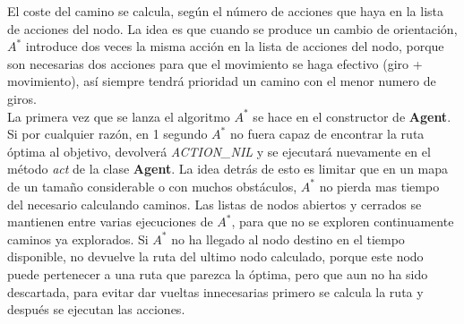 El coste del camino se calcula, según el número de acciones que haya en la lista de acciones del nodo. La idea es que  cuando se produce un cambio de orientación, $ A^{*} $ introduce dos veces la misma acción en la lista de acciones del nodo, porque son necesarias dos acciones para que el movimiento se haga efectivo (giro + movimiento), así siempre tendrá prioridad un camino con el menor numero de giros.\\
La primera vez que se lanza el algoritmo $ A^{*} $ se hace en el constructor de \textbf{Agent}. Si por cualquier razón, en 1 segundo $ A^{*} $ no fuera capaz de encontrar la ruta óptima al objetivo, devolverá \emph{ACTION\_NIL} y se ejecutará nuevamente en el método \emph{act} de la clase \textbf{Agent}. La idea detrás de esto es limitar que en un mapa de un tamaño considerable o con muchos obstáculos, $ A^{*} $ no pierda mas tiempo del necesario calculando caminos. Las listas de nodos abiertos y cerrados se mantienen entre varias ejecuciones de $ A^{*} $, para que no se exploren continuamente caminos ya explorados. Si $ A^{*} $ no ha llegado al nodo destino en el tiempo disponible, no devuelve la ruta del ultimo nodo calculado, porque este nodo puede pertenecer a una ruta que parezca la óptima, pero que aun no ha sido descartada, para evitar dar vueltas innecesarias primero se calcula la ruta y después se ejecutan las acciones.\\
\\

